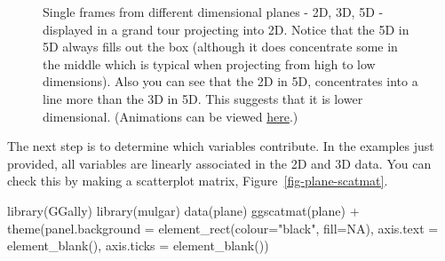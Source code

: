 \documentclass[
  letterpaper,
]{krantz}
\newenvironment{Shaded}{\begin{snugshade}}{\end{snugshade}}
\newcommand{\AttributeTok}[1]{\textcolor[rgb]{0.40,0.45,0.13}{#1}}
\newcommand{\ConstantTok}[1]{\textcolor[rgb]{0.56,0.35,0.01}{#1}}
\newcommand{\FunctionTok}[1]{\textcolor[rgb]{0.28,0.35,0.67}{#1}}
\newcommand{\NormalTok}[1]{\textcolor[rgb]{0.00,0.23,0.31}{#1}}
\newcommand{\SpecialCharTok}[1]{\textcolor[rgb]{0.37,0.37,0.37}{#1}}
\newcommand{\StringTok}[1]{\textcolor[rgb]{0.13,0.47,0.30}{#1}}
\begin{document}
\begin{figure}
\begin{minipage}[t]{0.33\linewidth}
{{}

}

\end{minipage}%

\caption{\label{fig-dimension-pdf}Single frames from different
dimensional planes - 2D, 3D, 5D - displayed in a grand tour projecting
into 2D. Notice that the 5D in 5D always fills out the box (although it
does concentrate some in the middle which is typical when projecting
from high to low dimensions). Also you can see that the 2D in 5D,
concentrates into a line more than the 3D in 5D. This suggests that it
is lower dimensional. (Animations can be viewed
\href{https://dicook.github.io/mulgar_book/3-intro-dimred.html}{here}.)}

\end{figure}

The next step is to determine which variables contribute. In the
examples just provided, all variables are linearly associated in the 2D
and 3D data. You can check this by making a scatterplot matrix,
Figure~\ref{fig-plane-scatmat}.

\begin{Shaded}
\begin{Highlighting}[]
\FunctionTok{library}\NormalTok{(GGally)}
\FunctionTok{library}\NormalTok{(mulgar)}
\FunctionTok{data}\NormalTok{(plane)}
\FunctionTok{ggscatmat}\NormalTok{(plane) }\SpecialCharTok{+}
  \FunctionTok{theme}\NormalTok{(}\AttributeTok{panel.background =} 
          \FunctionTok{element\_rect}\NormalTok{(}\AttributeTok{colour=}\StringTok{"black"}\NormalTok{, }\AttributeTok{fill=}\ConstantTok{NA}\NormalTok{),}
    \AttributeTok{axis.text =} \FunctionTok{element\_blank}\NormalTok{(),}
    \AttributeTok{axis.ticks =} \FunctionTok{element\_blank}\NormalTok{())}
\end{Highlighting}
\end{Shaded}
\end{document}
